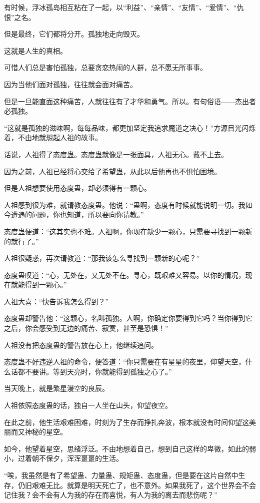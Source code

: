 \begin{this_body}
有时候，浮冰孤岛相互粘在了一起，以“利益”、“亲情”、“友情”、“爱情”、“仇恨”之名。

但是最终，它们都将分开。孤独地走向毁灭。

这就是人生的真相。

可惜人们总是害怕孤独，总要贪恋热闹的人群，总不愿无所事事。

因为当他们面对孤独，往往就会面对痛苦。

但是一旦能直面这种痛苦，人就往往有了才华和勇气。所以。有句俗语——杰出者必孤独。

“这就是孤独的滋味啊，每每品味，都更加坚定我追求魔道之决心！”方源目光闪烁着，不由地就想起人祖的故事。

话说，人祖得了态度蛊。态度蛊就像是一张面具，人祖无心。戴不上去。

因为之前，人祖已经将心交给了希望蛊，从此以后他再也不惧怕困境。

但是人祖想要使用态度蛊，却必须得有一颗心。

人祖感到很为难，就请教态度蛊。他说：“蛊啊，态度有时候就能说明一切。我如今遭遇的问题，你也知道，所以要向你请教。”

态度蛊便道：“这其实也不难。人祖啊，你现在缺少一颗心，只需要寻找到一颗新的就行了。”

人祖很疑惑，再次请教道：“那我该怎么寻找到一颗新的心呢？”

态度蛊叹道：“心，无处在，又无处不在。寻心，既艰难又容易。以你的情况，现在就能得到一颗心。”

人祖大喜：“快告诉我怎么得到？”

态度蛊却警告他：“这颗心，名叫孤独。人啊，你确定你要得到它吗？当你得到它之后，你会感受到无边的痛苦、寂寞，甚至是恐惧！”

人祖没有把态度蛊的警告放在心上，他继续追问。

态度蛊不好违逆人祖的命令，便答道：“你只需要在有星星的夜里，仰望天空，什么话都不要讲。等到天亮时，你就能得到孤独之心了。”

当天晚上，就是繁星漫空的良辰。

人祖依照态度蛊的话，独自一人坐在山头，仰望夜空。

在此之前，他生活艰难困难，时刻为了生存而挣扎奔波，根本就没有时间仰望这美丽而又神秘的星空。

如今，他望着星空，思绪浮泛。不由地想着自己，想到自己这样的卑微，如此的弱小，过着朝不保夕，浑浑噩噩的生活。

“唉，我虽然是有了希望蛊、力量蛊、规矩蛊、态度蛊，但是要在这片自然中生存，仍旧艰难无比。就算是明天死亡了，也不意外。如果我死了，这个世界会不会记住我？会不会有人为我的存在而喜悦，有人为我的离去而悲伤呢？”


\end{this_body}
